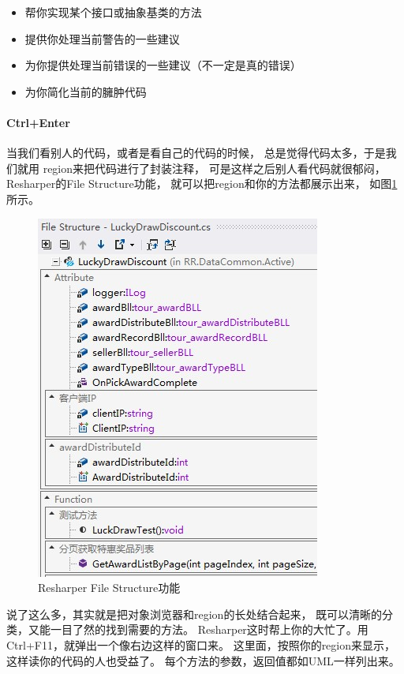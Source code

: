 \documentclass{book}
\begin{document}
\begin{itemize}
\item{帮你实现某个接口或抽象基类的方法}
\item{提供你处理当前警告的一些建议}
\item{为你提供处理当前错误的一些建议（不一定是真的错误）}
\item{为你简化当前的臃肿代码}
\end{itemize}

\paragraph{Ctrl+Enter}

当我们看别人的代码，或者是看自己的代码的时候，
总是觉得代码太多，于是我们就用 region来把代码进行了封装注释，
可是这样之后别人看代码就很郁闷，Resharper的File Structure功能，
就可以把region和你的方法都展示出来，
如图\ref{fig:ResharperFileStructure}所示。

\begin{figure}[htbp]
	\centering
	\includegraphics[scale=0.6]{ResharperFileStructure.jpg}
	\caption{Resharper File Structure功能}
	\label{fig:ResharperFileStructure}
\end{figure}

说了这么多，其实就是把对象浏览器和region的长处结合起来，
既可以清晰的分类，又能一目了然的找到需要的方法。
Resharper这时帮上你的大忙了。用Ctrl+F11，就弹出一个像右边这样的窗口来。
这里面，按照你的region来显示，这样读你的代码的人也受益了。
每个方法的参数，返回值都如UML一样列出来。
\end{document}
